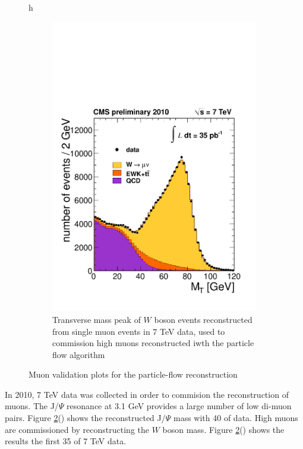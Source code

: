 \begin{figure}{h}
\begin{subfigure}[h]{0.40\textwidth}
        \includegraphics[width=\textwidth]{Figures/Reconstruction_Diagrams/MUO__Wmunu_35pb-1_lin.pdf}
        \caption{Transverse mass peak of $W$ boson events
          reconstructed from single muon events in 7 TeV data, used to
        commission high \PT muons reconstructed iwth the particle flow
      algorithm}\label{fig:muon_w_mass}
      \end{subfigure}
      \caption{Muon validation plots for the particle-flow reconstruction}\label{fig:muon_pf_validation}
\end{figure}

\par In 2010, 7 TeV data was collected \cite{CMS-PAS-PFT-10-003} in
order to commision the reconstruction of muons.  The J/$\Psi$
resonance at 3.1 GeV provides a large number of low \PT di-muon pairs.
Figure \ref{fig:muon_pf_validation}() shows
the reconstructed J/$\Psi$ mass with 40 \pbinv of data.  High \PT
muons are commissioned by reconstructing the $W$ boson mass.  Figure
\ref{fig:muon_pf_validation}() shows the
results the first 35 \pbinv of 7 TeV data.   


